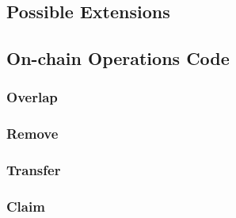\documentclass{article}
\begin{document}
\subsection{Possible Extensions}

\subsection{On-chain Operations Code}
\subsubsection{Overlap}
\begin{minipage}{\linewidth} %
  
\end{minipage}

\subsubsection{Remove}
\begin{minipage}{\linewidth} %
  
\end{minipage}

\subsubsection{Transfer}
\begin{minipage}{\linewidth} %
  
\end{minipage}

\subsubsection{Claim}\label{appendix:claim}
\begin{minipage}{\linewidth} %
  
\end{minipage}
\end{document}
